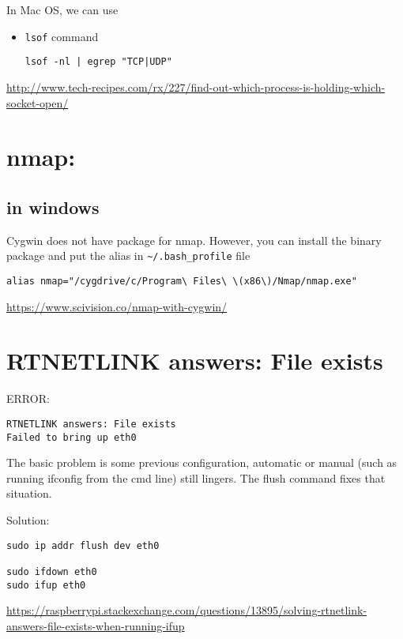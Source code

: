 In Mac OS, we can use
\begin{itemize}
  \item \verb!lsof! command
\begin{verbatim}
lsof -nl | egrep "TCP|UDP"
\end{verbatim}
\end{itemize}

\url{http://www.tech-recipes.com/rx/227/find-out-which-process-is-holding-which-socket-open/}

\section{nmap: }

\subsection{in windows}

Cygwin does not have package for nmap. However, you can install the binary
package and put the alias in \verb!~/.bash_profile! file
\begin{verbatim}
alias nmap="/cygdrive/c/Program\ Files\ \(x86\)/Nmap/nmap.exe"
\end{verbatim}

\url{https://www.scivision.co/nmap-with-cygwin/}

\section{RTNETLINK answers: File exists}

ERROR:
\begin{verbatim}
RTNETLINK answers: File exists
Failed to bring up eth0
\end{verbatim}
The basic problem is some previous configuration, automatic or manual (such as
running ifconfig from the cmd line) still lingers. The flush command fixes that
situation. 

Solution:
\begin{verbatim}
sudo ip addr flush dev eth0

sudo ifdown eth0
sudo ifup eth0
\end{verbatim}
\url{https://raspberrypi.stackexchange.com/questions/13895/solving-rtnetlink-answers-file-exists-when-running-ifup}